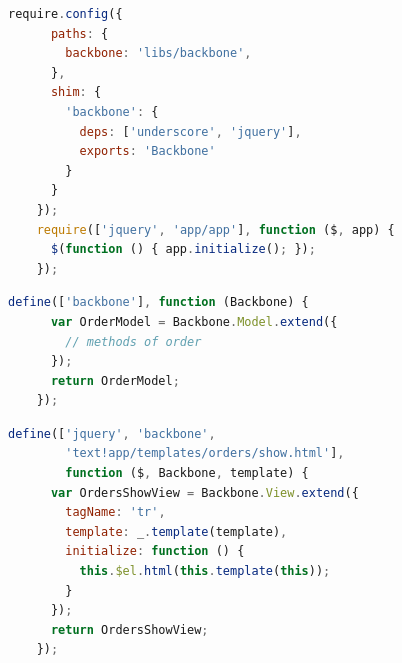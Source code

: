 \begin{Frame}[fragile,t]
  
  \begin{lstlisting}[language=JavaScript,gobble=4]
    require.config({
      paths: {
        backbone: 'libs/backbone',
      },
      shim: {
        'backbone': {
          deps: ['underscore', 'jquery'],
          exports: 'Backbone'
        }
      }
    });
    require(['jquery', 'app/app'], function ($, app) {
      $(function () { app.initialize(); });
    });
  \end{lstlisting}
\end{Frame}

\begin{Frame}[fragile,t]
  
  \begin{lstlisting}[language=JavaScript,gobble=4]
    define(['backbone'], function (Backbone) {
      var OrderModel = Backbone.Model.extend({
        // methods of order
      });
      return OrderModel;
    });
  \end{lstlisting}
\end{Frame}

\begin{Frame}[fragile,t]
  
  \begin{lstlisting}[language=JavaScript,gobble=4]
    define(['jquery', 'backbone',
        'text!app/templates/orders/show.html'],
        function ($, Backbone, template) {
      var OrdersShowView = Backbone.View.extend({
        tagName: 'tr',
        template: _.template(template),
        initialize: function () {
          this.$el.html(this.template(this));
        }
      });
      return OrdersShowView;
    });
  \end{lstlisting}
\end{Frame}

